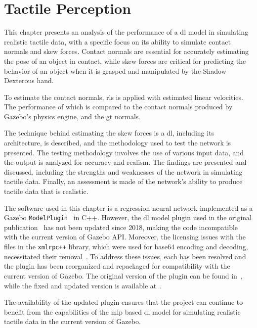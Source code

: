 \chapter{Tactile Perception} \label{ch:1-tactile-perception}

This chapter presents an analysis of the performance of a \gls{dl} model in simulating realistic tactile data, with a specific focus on its ability to simulate contact normals and skew forces. Contact normals are essential for accurately estimating the pose of an object in contact, while skew forces are critical for predicting the behavior of an object when it is grasped and manipulated by the Shadow Dexterous hand. \medskip

To estimate the contact normals, \gls{rls} is applied with estimated linear velocities. The performance of which is compared to the contact normals produced by Gazebo's physics engine, and the \gls{gt} normals.\medskip

The technique behind estimating the skew forces is a \gls{dl}, including its architecture, is described, and the methodology used to test the network is presented. The testing methodology involves the use of various input data, and the output is analyzed for accuracy and realism. The findings are presented and discussed, including the strengths and weaknesses of the network in simulating tactile data. Finally, an assessment is made of the network's ability to produce tactile data that is realistic. \medskip

The software used in this chapter is a regression neural network implemented as a Gazebo \texttt{ModelPlugin}~\cite{gazebo-model-plugin} in C++. However, the \gls{dl} model plugin used in the original publication~\cite{simulation-of-the-syntouch-biotac-sensor} has not been updated since 2018, making the code incompatible with the current version of Gazebo API. Moreover, the licensing issues with the files in the \texttt{xmlrpc++} library, which were used for base64 encoding and decoding, necessitated their removal~\cite{base64-encoding-decoding-licensing-issue}. To address these issues, each has been resolved and the plugin has been reorganized and repackaged for compatibility with the current version of Gazebo. The original version of the plugin can be found in~\cite{ruppel-philipp-biotac-gazebo-plugin}, while the fixed and updated version is available at~\cite{melbye-staven-biotac-sim-plugin}. \medskip

The availability of the updated plugin ensures that the project can continue to benefit from the capabilities of the \gls{mlp} based \gls{dl} model for simulating realistic tactile data in the current version of Gazebo.


